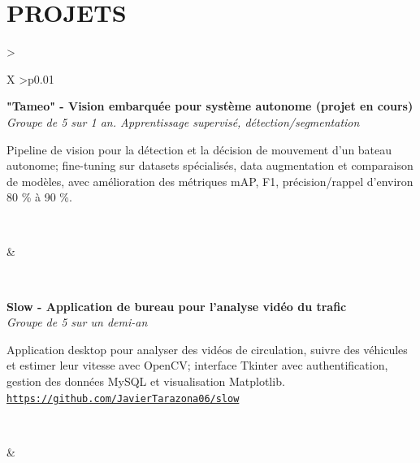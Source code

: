 \documentclass[letterpaper,10pt]{article}
\newcommand{\indentbox}[2][1em]{\hspace*{#1}\parbox{\dimexpr\linewidth-#1\relax}{#2}}
\begin{document}
\section{\textcolor{mydarkgreen}{\textbf{PROJETS}}}

  \begin{tabularx}{\textwidth}{>{\raggedright\arraybackslash}X >{\raggedleft\arraybackslash}p{0.01\textwidth}}
  
    \begin{minipage}[t]{\linewidth}\raggedright
      \textbf{"Tameo" - Vision embarquée pour système autonome (projet en cours)}\\
      \textit{\footnotesize Groupe de 5 sur 1 an. Apprentissage supervisé, détection/segmentation}\\
      \indentbox{\footnotesize Pipeline de vision pour la détection et la décision de mouvement d'un bateau autonome; fine-tuning sur datasets spécialisés, data augmentation et comparaison de modèles, avec amélioration des métriques mAP, F1, précision/rappel d'environ 80 \% à 90 \%.}\\
    \end{minipage}
    &
    \begin{minipage}[t]{\linewidth}\raggedleft %
    \end{minipage}\\

    \begin{minipage}[t]{\linewidth}\raggedright
      \textbf{Slow - Application de bureau pour l'analyse vidéo du trafic}\\
      \textit{\footnotesize Groupe de 5 sur un demi-an}\\
      \indentbox{\footnotesize Application desktop pour analyser des vidéos de circulation, suivre des véhicules et estimer leur vitesse avec OpenCV; interface Tkinter avec authentification, gestion des données MySQL et visualisation Matplotlib. \href{https://github.com/JavierTarazona06/slow}{\nolinkurl{https://github.com/JavierTarazona06/slow}}}\\
    \end{minipage}
    &
    \begin{minipage}[t]{\linewidth}\raggedleft %
    \end{minipage}\\


\end{tabularx}
\end{document}
